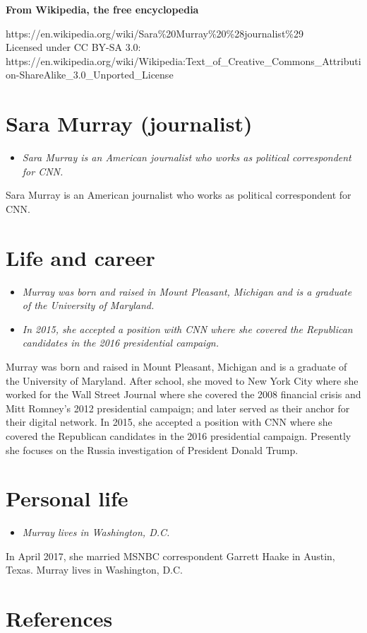 \textbf{From Wikipedia, the free encyclopedia}

https://en.wikipedia.org/wiki/Sara\%20Murray\%20\%28journalist\%29\\
Licensed under CC BY-SA 3.0:\\
https://en.wikipedia.org/wiki/Wikipedia:Text\_of\_Creative\_Commons\_Attribution-ShareAlike\_3.0\_Unported\_License

\section{Sara Murray (journalist)}\label{sara-murray-journalist}

\begin{itemize}
\item
  \emph{Sara Murray is an American journalist who works as political
  correspondent for CNN.}
\end{itemize}

Sara Murray is an American journalist who works as political
correspondent for CNN.

\section{Life and career}\label{life-and-career}

\begin{itemize}
\item
  \emph{Murray was born and raised in Mount Pleasant, Michigan and is a
  graduate of the University of Maryland.}
\item
  \emph{In 2015, she accepted a position with CNN where she covered the
  Republican candidates in the 2016 presidential campaign.}
\end{itemize}

Murray was born and raised in Mount Pleasant, Michigan and is a graduate
of the University of Maryland. After school, she moved to New York City
where she worked for the Wall Street Journal where she covered the 2008
financial crisis and Mitt Romney's 2012 presidential campaign; and later
served as their anchor for their digital network. In 2015, she accepted
a position with CNN where she covered the Republican candidates in the
2016 presidential campaign. Presently she focuses on the Russia
investigation of President Donald Trump.

\section{Personal life}\label{personal-life}

\begin{itemize}
\item
  \emph{Murray lives in Washington, D.C.}
\end{itemize}

In April 2017, she married MSNBC correspondent Garrett Haake in Austin,
Texas. Murray lives in Washington, D.C.

\section{References}\label{references}
